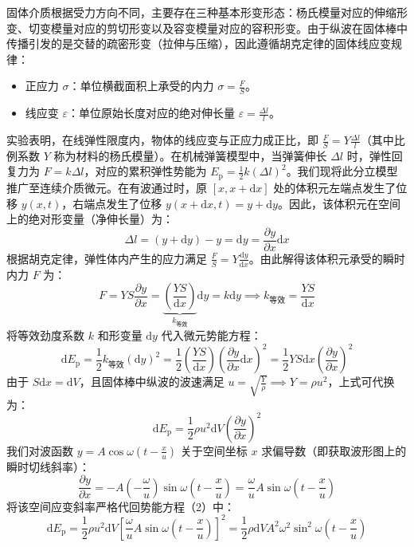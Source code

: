 \documentclass[lang=cn,11pt]{elegantbook}
\begin{document}
\begin{definition}[体积元的弹性势能推导]
固体介质根据受力方向不同，主要存在三种基本形变形态：杨氏模量对应的伸缩形变、切变模量对应的剪切形变以及容变模量对应的容积形变。由于纵波在固体棒中传播引发的是交替的疏密形变（拉伸与压缩），因此遵循胡克定律的固体线应变规律：
\begin{itemize}
\item 正应力 $\sigma$：单位横截面积上承受的内力 $\sigma = \frac{F}{S}$。
\item 线应变 $\varepsilon$：单位原始长度对应的绝对伸长量 $\varepsilon = \frac{\Delta l}{l}$。
\end{itemize}
实验表明，在线弹性限度内，物体的线应变与正应力成正比，即 $\frac{F}{S} = Y \frac{\Delta l}{l}$（其中比例系数 $Y$ 称为材料的杨氏模量）。在机械弹簧模型中，当弹簧伸长 $\Delta l$ 时，弹性回复力为 $F = k\Delta l$，对应的累积弹性势能为 $E_{\text{p}} = \frac{1}{2}k(\Delta l)^2$。我们现将此分立模型推广至连续介质微元。在有波通过时，原 $[x, x+\mathrm{d}x]$ 处的体积元左端点发生了位移 $y(x,t)$，右端点发生了位移 $y(x+\mathrm{d}x, t) = y + \mathrm{d}y$。因此，该体积元在空间上的绝对形变量（净伸长量）为：$$\Delta l = (y + \mathrm{d}y) - y = \mathrm{d}y = \frac{\partial y}{\partial x}\mathrm{d}x$$根据胡克定律，弹性体内产生的应力满足 $\frac{F}{S} = Y \frac{\mathrm{d}y}{\mathrm{d}x}$。由此解得该体积元承受的瞬时内力 $F$ 为：$$F = Y S \frac{\partial y}{\partial x} = \underbrace{\left( \frac{YS}{\mathrm{d}x} \right)}_{k_{\text{等效}}} \mathrm{d}y = k \mathrm{d}y \implies k_{\text{等效}} = \frac{YS}{\mathrm{d}x}$$将等效劲度系数 $k$ 和形变量 $\mathrm{d}y$ 代入微元势能方程：$$\mathrm{d}E_{\text{p}} = \frac{1}{2} k_{\text{等效}} (\mathrm{d}y)^2 = \frac{1}{2} \left( \frac{YS}{\mathrm{d}x} \right) \left( \frac{\partial y}{\partial x} \mathrm{d}x \right)^2 = \frac{1}{2} Y S \mathrm{d}x \left( \frac{\partial y}{\partial x} \right)^2$$由于 $S\mathrm{d}x = \mathrm{d}V$，且固体棒中纵波的波速满足 $u = \sqrt{\frac{Y}{\rho}} \implies Y = \rho u^2$，上式可代换为：$$\mathrm{d}E_{\text{p}} = \frac{1}{2} \rho u^2 \mathrm{d}V \left( \frac{\partial y}{\partial x} \right)^2 $$我们对波函数 $y = A \cos \omega \left( t - \frac{x}{u} \right)$ 关于空间坐标 $x$ 求偏导数（即获取波形图上的瞬时切线斜率）：$$\frac{\partial y}{\partial x} = -A \left( -\frac{\omega}{u} \right) \sin \omega \left( t - \frac{x}{u} \right) = \frac{\omega}{u} A \sin \omega \left( t - \frac{x}{u} \right)$$将该空间应变斜率严格代回势能方程（2）中：$$\mathrm{d}E_{\text{p}} = \frac{1}{2} \rho u^2 \mathrm{d}V \left[ \frac{\omega}{u} A \sin \omega \left( t - \frac{x}{u} \right) \right]^2= \frac{1}{2} \rho \mathrm{d}V A^2 \omega^2 \sin^2 \omega \left( t - \frac{x}{u} \right)$$
\end{definition}
\end{document}
